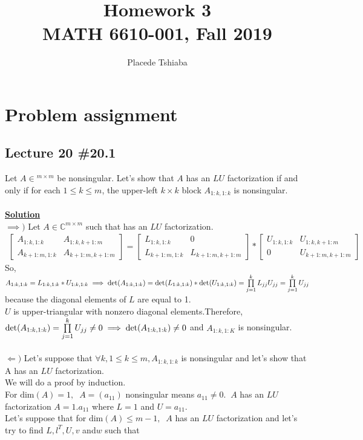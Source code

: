 \documentclass[11pt]{article}
\begin{document}
\title{Homework 3\\MATH 6610-001, Fall 2019}
\author{Placede Tshiaba}
\maketitle

\section*{Problem assignment}
\subsection*{Lecture 20 \#20.1}
Let $ A \in \mathbb{}^{m \times m}$ be nonsingular. Let's show that $A$ has an $LU$ factorization if and only if for each $1 \le k \le m$, the upper-left $k\times k$ block $A_{1:k, 1:k}$ is nonsingular.\\\\
\underline{\textbf{Solution}}\\
$\implies)$ Let $A \in \mathbb{C}^{m \times m}$ such that has an $LU$ factorization.
\begin{align*}
\begin{bmatrix}
A_{1:k, 1:k} & A_{1:k, k+1:m}\\
A_{k+1:m, 1:k} & A_{k+1:m, k+1:m}
\end{bmatrix}
= 
\begin{bmatrix}
L_{1:k, 1:k} & 0\\
L_{k+1:m, 1:k} & L_{k+1:m, k+1:m}
\end{bmatrix}
*
\begin{bmatrix}
U_{1:k, 1:k} & U_{1:k, k+1:m}\\
0 & U_{k+1:m, k+1:m}
\end{bmatrix}
\end{align*}
So, $ A_{1:k, 1:k}  = L_{1:k, 1:k}*U_{1:k, 1:k} \\
\implies \text{det}(A_{1:k, 1:k}) = \text{det}(L_{1:k, 1:k})*\text{det}(U_{1:k, 1:k}) = \prod\limits_{j=1}^{k}{L_{jj}U_{jj}} =\prod\limits_{j=1}^{k}{U_{jj}} $ because the diagonal elements of $L$ are equal to 1.\\
 $U$ is upper-triangular  with nonzero diagonal elements.Therefore, $\text{det}(A_{1:k, 1:k}) = \prod\limits_{j=1}^{k}{U_{jj}} \ne 0\\
\implies \text{det}(A_{1:k, 1:k}) \ne 0$ and $A_{1:k, 1:K}$ is nonsingular.\\\\
$\Longleftarrow)$  Let's suppose that $\forall k, 1\le k\le m, A_{1:k, 1:k}$ is nonsingular and let's show that A has an $LU$ factorization.\\
We will do a proof by induction.\\
For $\text{dim} (A) =1,\;\; A = (a_{11})$ nonsingular means $a_{11} \ne 0.\;\; A$ has an $LU$ factorization $ A = 1.a_{11}$  where  $L= 1$ and $U = a_{11}.$\\
Let's suppose that for $\text{dim}(A) \le m-1, \;\; A$ has an $LU$ factorization and let's try to find $L, l^T, U, v$ and$ w$ such that
\end{document}
